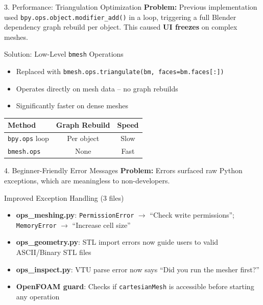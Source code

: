 \documentclass[dvipsnames,mathserif]{beamer}
\begin{document}
\begin{frame}{3. Performance: Triangulation Optimization}
    \textbf{Problem:} Previous implementation used \texttt{bpy.ops.object.modifier\_add()} in a loop, triggering a full Blender dependency graph rebuild per object. This caused \textbf{UI freezes} on complex meshes.
    \vspace{0.3cm}
    \begin{block}{Solution: Low-Level \texttt{bmesh} Operations}
        \begin{itemize}
            \item Replaced with \texttt{bmesh.ops.triangulate(bm, faces=bm.faces[:])}
            \item Operates directly on mesh data -- no graph rebuilds
            \item Significantly faster on dense meshes
        \end{itemize}
    \end{block}
    \vspace{0.1cm}
    \begin{center}
        \small
        \begin{tabular}{lcc}
            \toprule
            \textbf{Method} & \textbf{Graph Rebuild} & \textbf{Speed} \\
            \midrule
            \texttt{bpy.ops} loop & Per object & Slow \\
            \texttt{bmesh.ops} & None & Fast \\
            \bottomrule
        \end{tabular}
    \end{center}
\end{frame}

\begin{frame}{4. Beginner-Friendly Error Messages}
    \textbf{Problem:} Errors surfaced raw Python exceptions, which are meaningless to non-developers.
    \vspace{0.2cm}
    \begin{block}{Improved Exception Handling (3 files)}
        \begin{itemize}
            \item \textbf{ops\_meshing.py}: \texttt{PermissionError} $\rightarrow$ ``Check write permissions''; \texttt{MemoryError} $\rightarrow$ ``Increase cell size''
            \item \textbf{ops\_geometry.py}: STL import errors now guide users to valid ASCII/Binary STL files
            \item \textbf{ops\_inspect.py}: VTU parse error now says ``Did you run the mesher first?''
            \item \textbf{OpenFOAM guard}: Checks if \texttt{cartesianMesh} is accessible before starting any operation
        \end{itemize}
    \end{block}
\end{frame}
\end{document}
